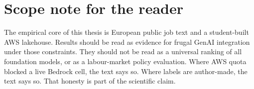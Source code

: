 \section{Scope note for the reader}
\label{sec:scope-note}

The empirical core of this thesis is European public job text and a student-built AWS lakehouse. Results should be read as evidence for frugal GenAI integration under those constraints. They should not be read as a universal ranking of all foundation models, or as a labour-market policy evaluation. Where AWS quota blocked a live Bedrock cell, the text says so. Where labels are author-made, the text says so. That honesty is part of the scientific claim.
